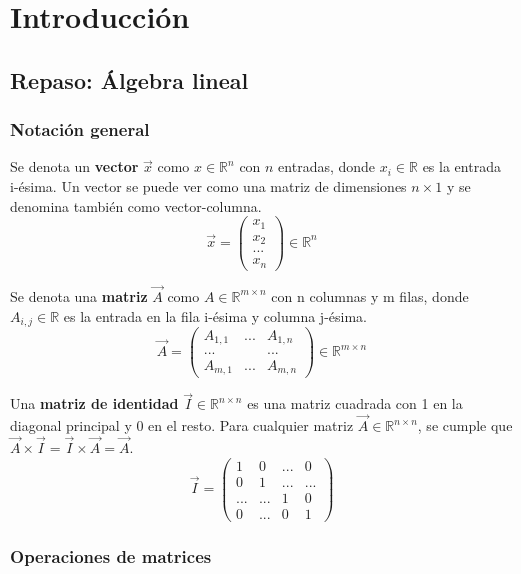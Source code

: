 \chapter{Introducción}
\section{Repaso: Álgebra lineal}
\subsection{Notación general}
Se denota un \textbf{vector} $\vec{x}$ como $x \in \mathbb{R}^n$ con $n$ entradas, donde $x_i \in \mathbb{R}$ es la entrada i-ésima. Un vector se puede ver como una matriz de dimensiones $n \times 1$ y se denomina también como vector-columna.
$$\vec{x} = \begin{pmatrix}
x_1 \\ x_2 \\ ... \\ x_n
\end{pmatrix} \in \mathbb{R}^n$$

Se denota una \textbf{matriz} $\vec{A}$ como $A \in \mathbb{R}^{m \times n}$ con n columnas y m filas, donde $A_{i,j} \in \mathbb{R}$ es la entrada en la fila i-ésima y columna j-ésima.
$$\vec{A} = \begin{pmatrix}
A_{1,1} & ... & A_{1,n} \\
... & & ...\\
A_{m,1} & ... & A_{m,n}
\end{pmatrix} \in \mathbb{R}^{m \times n}$$

Una \textbf{matriz de identidad} $\vec{I} \in \mathbb{R}^{n \times n}$ es una matriz cuadrada con 1 en la diagonal principal y 0 en el resto. Para cualquier matriz $\vec{A} \in \mathbb{R}^{n \times n}$, se cumple que $\vec{A} \times \vec{I} = \vec{I} \times \vec{A} = \vec{A}$.
$$\vec{I} = \begin{pmatrix}
1 & 0 & ... & 0 \\
0 & 1 & ... & ... \\
... & ... & 1 & 0 \\
0 & ... & 0 & 1
\end{pmatrix}$$

\subsection{Operaciones de matrices}
